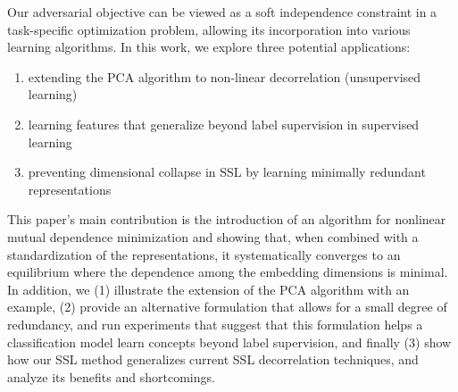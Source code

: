 Our adversarial objective can be viewed as a soft independence constraint in a task-specific optimization problem, allowing its incorporation into various learning algorithms. In this work, we explore three potential applications:
\begin{enumerate}[itemsep=2pt,topsep=0pt,parsep=0pt,partopsep=0pt]
    \item extending the PCA algorithm to non-linear decorrelation (unsupervised learning)
    \item learning features that generalize beyond label supervision in supervised learning
    \item preventing dimensional collapse in SSL by learning minimally redundant representations
\end{enumerate}

This paper's main contribution is the introduction of an algorithm for nonlinear mutual dependence minimization and showing that, when combined with a standardization of the representations, it systematically converges to an equilibrium where the dependence among the embedding dimensions is minimal. 
In addition, we 
(1) illustrate the extension of the PCA algorithm with an example, 
(2) provide an alternative formulation that allows for a small degree of redundancy, and run experiments that suggest that this formulation helps a classification model learn concepts beyond label supervision, 
and finally (3) show how our SSL method generalizes current SSL decorrelation techniques, and analyze its benefits and shortcomings. 
